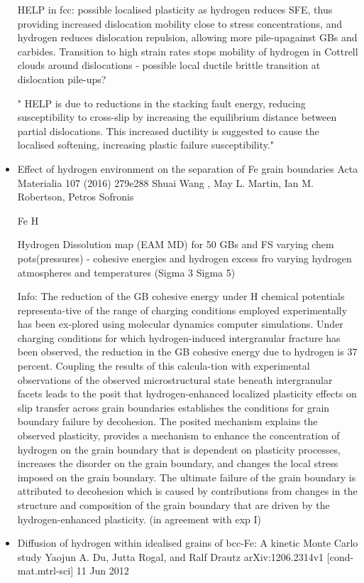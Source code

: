 \documentclass[11pt,floatfix,showpacs]{amsart}
\begin{document}
\begin{itemize}
HELP in fcc: possible localised plasticity as hydrogen reduces SFE, thus providing increased dislocation mobility close to stress concentrations, and hydrogen reduces dislocation repulsion, allowing more pile-upagainst GBs and carbides.
Transition to high strain rates stops mobility of hydrogen in Cottrell clouds around dislocations - possible local ductile brittle transition at dislocation pile-ups?

" HELP is due to reductions
in the stacking fault energy, reducing susceptibility to
cross-slip by increasing the equilibrium distance
between partial dislocations. This increased ductility
is suggested to cause the localised softening,
increasing plastic failure susceptibility."


\item Effect of hydrogen environment on the separation of Fe grain
boundaries
Acta Materialia 107 (2016) 279e288
Shuai Wang , May L. Martin, Ian M. Robertson, Petros Sofronis 

Fe H 

Hydrogen Dissolution map (EAM MD) for 50 GBs and FS varying chem pots(pressures) - cohesive energies and hydrogen excess fro varying hydrogen 
atmospheres and temperatures (Sigma 3 Sigma 5)

Info: 
The reduction of the GB cohesive energy under H chemical potentials representa-tive of the range of charging conditions employed experimentally has been ex-plored using molecular dynamics computer simulations. Under charging conditions for which
hydrogen-induced intergranular fracture has been observed, the reduction in the GB cohesive energy due to hydrogen is 37 percent. Coupling the results of this calcula-tion with experimental observations of the observed microstructural state beneath intergranular facets leads to the posit that hydrogen-enhanced localized plasticity
effects on slip transfer across grain boundaries establishes the conditions for grain boundary failure by decohesion. The posited mechanism explains the observed plasticity, provides a mechanism to enhance the concentration of hydrogen on the grain boundary that is dependent on plasticity processes, increases the disorder on
the grain boundary, and changes the local stress imposed on the grain boundary. The ultimate failure of the grain boundary is attributed to decohesion which is caused by contributions from changes in the structure and composition of the grain boundary
that are driven by the hydrogen-enhanced plasticity.
(in agreement with exp I)


\item Diffusion of hydrogen within idealised grains of bcc-Fe: A kinetic Monte Carlo study
Yaojun A. Du, Jutta Rogal, and Ralf Drautz
arXiv:1206.2314v1 [cond-mat.mtrl-sci] 11 Jun 2012


\end{itemize}
\end{document}
